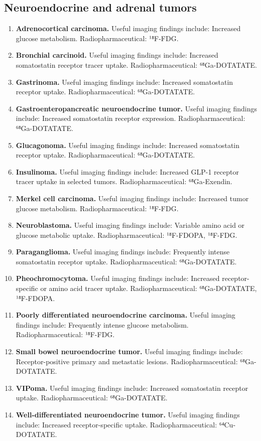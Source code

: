 \subsection{Neuroendocrine and adrenal tumors}
\begin{enumerate}[leftmargin=*,itemsep=0.45em,topsep=0.4em]
\item \textbf{Adrenocortical carcinoma.} Useful imaging findings include: Increased glucose metabolism. Radiopharmaceutical: ¹⁸F-FDG.
\item \textbf{Bronchial carcinoid.} Useful imaging findings include: Increased somatostatin receptor tracer uptake. Radiopharmaceutical: ⁶⁸Ga-DOTATATE.
\item \textbf{Gastrinoma.} Useful imaging findings include: Increased somatostatin receptor uptake. Radiopharmaceutical: ⁶⁸Ga-DOTATATE.
\item \textbf{Gastroenteropancreatic neuroendocrine tumor.} Useful imaging findings include: Increased somatostatin receptor expression. Radiopharmaceutical: ⁶⁸Ga-DOTATATE.
\item \textbf{Glucagonoma.} Useful imaging findings include: Increased somatostatin receptor uptake. Radiopharmaceutical: ⁶⁸Ga-DOTATATE.
\item \textbf{Insulinoma.} Useful imaging findings include: Increased GLP-1 receptor tracer uptake in selected tumors. Radiopharmaceutical: ⁶⁸Ga-Exendin.
\item \textbf{Merkel cell carcinoma.} Useful imaging findings include: Increased tumor glucose metabolism. Radiopharmaceutical: ¹⁸F-FDG.
\item \textbf{Neuroblastoma.} Useful imaging findings include: Variable amino acid or glucose metabolic uptake. Radiopharmaceutical: ¹⁸F-FDOPA, ¹⁸F-FDG.
\item \textbf{Paraganglioma.} Useful imaging findings include: Frequently intense somatostatin receptor uptake. Radiopharmaceutical: ⁶⁸Ga-DOTATATE.
\item \textbf{Pheochromocytoma.} Useful imaging findings include: Increased receptor-specific or amino acid tracer uptake. Radiopharmaceutical: ⁶⁸Ga-DOTATATE, ¹⁸F-FDOPA.
\item \textbf{Poorly differentiated neuroendocrine carcinoma.} Useful imaging findings include: Frequently intense glucose metabolism. Radiopharmaceutical: ¹⁸F-FDG.
\item \textbf{Small bowel neuroendocrine tumor.} Useful imaging findings include: Receptor-positive primary and metastatic lesions. Radiopharmaceutical: ⁶⁸Ga-DOTATATE.
\item \textbf{VIPoma.} Useful imaging findings include: Increased somatostatin receptor uptake. Radiopharmaceutical: ⁶⁸Ga-DOTATATE.
\item \textbf{Well-differentiated neuroendocrine tumor.} Useful imaging findings include: Increased receptor-specific uptake. Radiopharmaceutical: ⁶⁴Cu-DOTATATE.
\end{enumerate}

